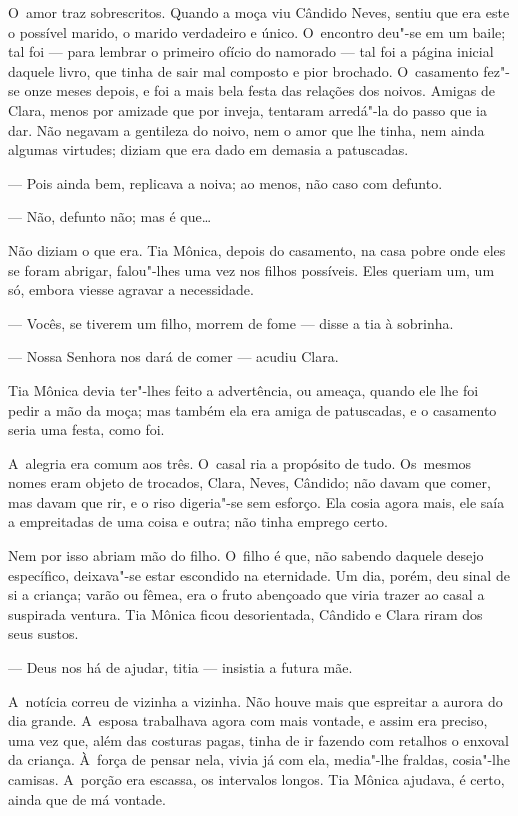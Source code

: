 \begin{linenumbers}
O~amor traz sobrescritos. Quando a moça viu Cândido Neves, sentiu que
era este o possível marido, o marido verdadeiro e único. O~encontro
deu"-se em um baile; tal foi --- para lembrar o primeiro ofício do
namorado --- tal foi a página inicial daquele livro, que tinha de sair
mal composto e pior brochado. O~casamento fez"-se onze meses depois, e
foi a mais bela festa das relações dos noivos. Amigas de Clara, menos
por amizade que por inveja, tentaram arredá"-la do passo que ia dar. Não
negavam a gentileza do noivo, nem o amor que lhe tinha, nem ainda
algumas virtudes; diziam que era dado em demasia a patuscadas.

--- Pois ainda bem, replicava a noiva; ao menos, não caso com defunto.

--- Não, defunto não; mas é que\ldots{}

Não diziam o que era. Tia Mônica, depois do casamento, na casa pobre
onde eles se foram abrigar, falou"-lhes uma vez nos filhos possíveis.
Eles queriam um, um só, embora viesse agravar a necessidade.

--- Vocês, se tiverem um filho, morrem de fome --- disse a tia à sobrinha.

--- Nossa Senhora nos dará de comer --- acudiu Clara.

Tia Mônica devia ter"-lhes feito a advertência, ou ameaça, quando ele lhe
foi pedir a mão da moça; mas também ela era amiga de patuscadas, e o
casamento seria uma festa, como foi.

A~alegria era comum aos três. O~casal ria a propósito de tudo. Os~mesmos
nomes eram objeto de trocados, Clara, Neves, Cândido; não davam que
comer, mas davam que rir, e o riso digeria"-se sem esforço. Ela cosia
agora mais, ele saía a empreitadas de uma coisa e outra; não tinha
emprego certo.

Nem por isso abriam mão do filho. O~filho é que, não sabendo daquele
desejo específico, deixava"-se estar escondido na eternidade. Um dia,
porém, deu sinal de si a criança; varão ou fêmea, era o fruto abençoado
que viria trazer ao casal a suspirada ventura. Tia Mônica ficou
desorientada, Cândido e Clara riram dos seus sustos.

--- Deus nos há de ajudar, titia --- insistia a futura mãe.

A~notícia correu de vizinha a vizinha. Não houve mais que espreitar a
aurora do dia grande. A~esposa trabalhava agora com mais vontade, e
assim era preciso, uma vez que, além das costuras pagas, tinha de ir
fazendo com retalhos o enxoval da criança. À~força de pensar nela, vivia
já com ela, media"-lhe fraldas, cosia"-lhe camisas. A~porção era escassa,
os intervalos longos. Tia Mônica ajudava, é certo, ainda que de má
vontade.


\end{linenumbers}
